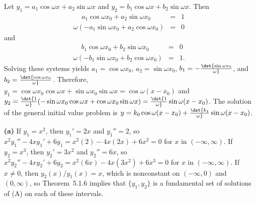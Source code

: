 \documentclass[dvips]{book}
\renewcommand{\exer}[1]{\par\medskip\;\noindent{\color{red}\bf #1.}}
\numberwithin{example}{section}
\numberwithin{equation}{section}
\numberwithin{theorem}{section}
\numberwithin{table}{section}
\numberwithin{figure}{section}
\begin{document}
\exer{5.1.40}
Let $y_1=a_1\cos\omega x+a_2\sin\omega x$ and
 $y_2=b_1\cos\omega x+b_2\sin\omega x$. Then
\begin{eqnarray*}
\phantom{(-}a_1\cos\omega x_0+a_2\sin\omega x_0\phantom{)}&=&1\\
\omega(-a_1\sin\omega x_0+a_2\cos\omega x_0)&=&0
\end{eqnarray*}
and
\begin{eqnarray*}
\phantom{(-}b_1\cos\omega x_0+b_2\sin\omega x_0\phantom{)}&=&0\\
\omega(-b_1\sin\omega x_0+b_2\cos\omega x_0)&=&1.
\end{eqnarray*}
Solving these systems yields $a_1=\cos\omega x_0$,
$a_2=\sin\omega x_0$, $b_1=-\dst{\sin\omega x_0\over\omega}$, and
$b_2=\dst{\cos\omega x_0\over\omega}$. Therefore,
$y_1=\cos\omega x_0\cos\omega x+\sin\omega x_0\sin\omega
x=\cos\omega(x-x_0)$ and
 $y_2=\dst{1\over\omega}(-\sin\omega x_0\cos\omega x+\cos\omega x_0
\sin\omega x)=\dst{1\over\omega}\sin\omega(x-x_0)$.
 The solution of the general
initial value problem is
$y=k_0\cos\omega(x-x_0)+\dst{k_1\over\omega}\sin\omega(x-x_0)$.


\exer{5.1.42}
{\bf (a)}
 If $y_1=x^2$, then $y_1'=2x$ and $y_1''=2$, so
$x^2y_1''-4xy_1'+6y_1=x^2(2)-4x(2x)+6x^2=0$
for $x$ in $(-\infty,\infty)$.
 If $y_2=x^3$, then $y_2'=3x^2$ and $y_2''=6x$, so
$x^2y_2''-4xy_2'+6y_2=x^2(6x)-4x(3x^2)+6x^3=0$
for $x$ in $(-\infty,\infty)$. If $x\ne0$, then $y_2(x)/y_1(x)=x$,
which is nonconstant on $(-\infty,0)$ and $(0,\infty)$, so
Theorem~5.1.6 implies that  $\{y_1,y_2\}$ is a fundamental
set of solutions of (A) on each of these intervals.
\end{document}
